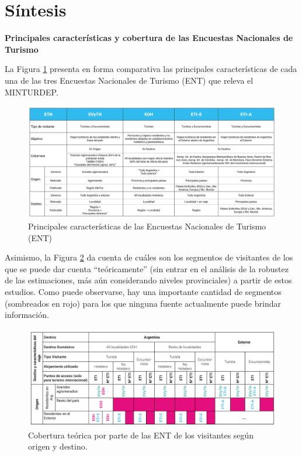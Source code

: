 \documentclass[
]{book}
\begin{document}
\hypertarget{suxedntesis}{%
\section{Síntesis}\label{suxedntesis}}

\textbf{Principales características y cobertura de las Encuestas Nacionales de Turismo}

La Figura \ref{fig:ent} presenta en forma comparativa las principales características de cada una de las tres Encuestas Nacionales de Turismo (ENT) que releva el MINTURDEP.

\begin{figure}

{\centering \includegraphics[width=0.8\linewidth]{imagenes/figura2.3} 

}

\caption{Principales características de las Encuestas Nacionales de Turismo (ENT)}\label{fig:ent}
\end{figure}

Asimismo, la Figura \ref{fig:coberturaENT} da cuenta de cuáles son los segmentos de visitantes de los que se puede dar cuenta ``teóricamente'' (sin entrar en el análisis de la robustez de las estimaciones, más aún considerando niveles provinciales) a partir de estos estudios.
Como puede observarse, hay una importante cantidad de segmentos (sombreados en rojo) para los que ninguna fuente actualmente puede brindar información.

\begin{figure}

{\centering \includegraphics[width=0.8\linewidth]{imagenes/figura2.4} 

}

\caption{Cobertura teórica por parte de las ENT de los visitantes según origen y destino.}\label{fig:coberturaENT}
\end{figure}
\end{document}
